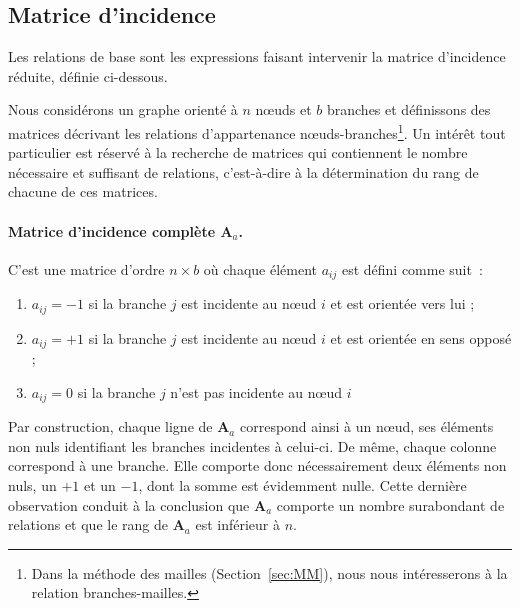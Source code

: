 \subsection{Matrice d'incidence}
Les relations de base sont les expressions faisant intervenir la matrice d'incidence réduite, définie ci-dessous.


Nous considérons un graphe orienté à $n$ nœuds et $b$ branches
et définissons des matrices décrivant les relations d'appartenance nœuds-branches\footnote{Dans la méthode des mailles (Section~\ref{sec:MM}), nous nous intéresserons à la relation branches-mailles.}.
Un intérêt tout particulier est réservé à la recherche de matrices qui contiennent le nombre nécessaire et
suffisant de relations, c'est-à-dire à la détermination du rang de chacune de ces matrices.

\paragraph{Matrice d'incidence complète $\mathbf{A}_a$.} C'est une matrice d'ordre $n \times b$ où chaque élément $a_{ij}$ est défini comme suit~:
\begin{enumerate}
\item $a_{ij} = -1$ si la branche $j$ est incidente au nœud $i$ et est orientée vers lui ;
\item $a_{ij} = +1$ si la branche $j$ est incidente au nœud $i$ et est orientée en sens opposé ;
\item $a_{ij} = 0$ si la branche $j$ n'est pas incidente au nœud $i$
\end{enumerate}

Par construction, chaque ligne de $\mathbf{A}_a$ correspond ainsi à un nœud, ses éléments non
nuls identifiant les branches incidentes à celui-ci. De même, chaque colonne correspond
à une branche. Elle comporte donc nécessairement deux éléments non nuls, un $+1$ et
un $-1$, dont la somme est évidemment nulle. Cette dernière observation conduit à la conclusion que $\mathbf{A}_a$ comporte un nombre
surabondant de relations et que le rang de $\mathbf{A}_a$ est inférieur à $n$.

